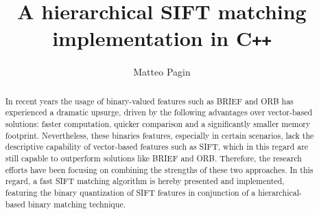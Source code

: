 \documentclass[a4paper, 11pt, oneside]{article}
\date{}
\begin{document}
\title{\vspace{-2.0cm}\huge \textbf{A hierarchical SIFT matching \\ implementation in C\texttt{++}} }
\author[1]{\Large Matteo Pagin}

\maketitle

\thispagestyle{empty}

\begin{abstract}
	In recent years the usage of binary-valued features such as BRIEF and ORB has experienced a dramatic upsurge, driven by the following advantages over vector-based solutions: faster computation, quicker comparison and a significantly smaller memory footprint. Nevertheless, these binaries features, especially in certain scenarios, lack the descriptive capability of vector-based features such as SIFT, which in this regard are still capable to outperform solutions like BRIEF and ORB. Therefore, the research efforts have been focusing on combining the strengths of these two approaches. In this regard, a fast SIFT matching algorithm is hereby presented and implemented, featuring the binary quantization of SIFT features in conjunction of a hierarchical-based binary matching technique.
\end{abstract}
\end{document}
